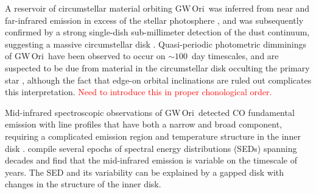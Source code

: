 \documentclass[twocolumn]{aastex61}
\newcommand{\todo}[1]{ \textcolor{red}{#1}}
\newcommand{\gw}{GW\,Ori}
\begin{document}
A reservoir of circumstellar material orbiting \gw\ was inferred from near and far-infrared emission in excess of the stellar photosphere \citep{mathieu91}, and was subsequently confirmed by a strong single-dish sub-millimeter detection of the dust continuum, suggesting a massive circumstellar disk \citep[$M_\mathrm{disk} \gtrsim 0.1\,M_\odot$;][]{mathieu95}. Quasi-periodic photometric dimminings of \gw\ have been observed to occur on $\sim100\,$ day timescales, and are suspected to be due from material in the circumstellar disk occulting the primary star \citep{shevchenko92,shevchenko98}, although the fact that edge-on orbital inclinations are ruled out complicates this interpretation.\todo{Need to introduce this in proper chonological order.}

Mid-infrared spectroscopic observations of \gw\ detected CO fundamental emission with line profiles that have both a narrow and broad component, requiring a complicated emission region and temperature structure in the inner disk \citep{najita03}. \citet{fang14} compile several epochs of spectral energy distributions (SEDs) spanning decades and find that the mid-infrared emission is variable on the timescale of years. The SED and its variability can be explained by a gapped disk with changes in the structure of the inner disk.




\end{document}
